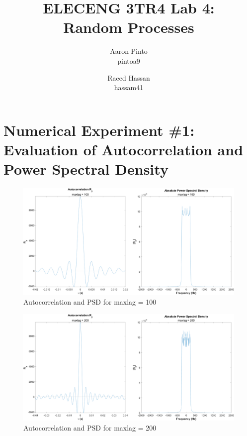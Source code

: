 \documentclass[12pt]{article}
\title{ELECENG 3TR4 Lab 4: \\ Random Processes}
\author{
    Aaron Pinto \\ pintoa9
    \and
    Raeed Hassan \\ hassam41
}
\begin{document}
\maketitle
\clearpage

\section*{Numerical Experiment \#1: Evaluation of Autocorrelation and Power Spectral Density}



\begin{figure}[h]
	\centering
	\includegraphics[width=\textwidth]{exp1_maxlag_100}
	\caption{\label{fig:exp1_maxlag100}Autocorrelation and PSD for maxlag = 100}
\end{figure}

\begin{figure}[h]
	\centering
	\includegraphics[width=\textwidth]{exp1_maxlag_200}
	\caption{\label{fig:exp1_maxlag200}Autocorrelation and PSD for maxlag = 200}
\end{figure}
\end{document}
